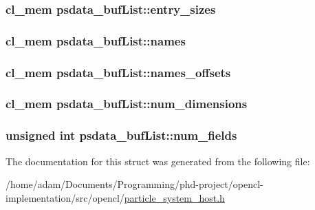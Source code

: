 \subsubsection[{entry\+\_\+sizes}]{\setlength{\rightskip}{0pt plus 5cm}cl\+\_\+mem psdata\+\_\+buf\+List\+::entry\+\_\+sizes}\label{structpsdata__bufList_a887652ee87b5f358abf6ad65f37b4800}
\hypertarget{structpsdata__bufList_a692e26c884416e7b932f2785eb0a9f97}{}
\subsubsection[{names}]{\setlength{\rightskip}{0pt plus 5cm}cl\+\_\+mem psdata\+\_\+buf\+List\+::names}\label{structpsdata__bufList_a692e26c884416e7b932f2785eb0a9f97}
\hypertarget{structpsdata__bufList_a959534753c9b5429408fdb1c99f4479c}{}
\subsubsection[{names\+\_\+offsets}]{\setlength{\rightskip}{0pt plus 5cm}cl\+\_\+mem psdata\+\_\+buf\+List\+::names\+\_\+offsets}\label{structpsdata__bufList_a959534753c9b5429408fdb1c99f4479c}
\hypertarget{structpsdata__bufList_ab88f6bd66f625383d9781707d266cd66}{}
\subsubsection[{num\+\_\+dimensions}]{\setlength{\rightskip}{0pt plus 5cm}cl\+\_\+mem psdata\+\_\+buf\+List\+::num\+\_\+dimensions}\label{structpsdata__bufList_ab88f6bd66f625383d9781707d266cd66}
\hypertarget{structpsdata__bufList_a8150194819034d266db259d3469e3093}{}
\subsubsection[{num\+\_\+fields}]{\setlength{\rightskip}{0pt plus 5cm}unsigned int psdata\+\_\+buf\+List\+::num\+\_\+fields}\label{structpsdata__bufList_a8150194819034d266db259d3469e3093}


The documentation for this struct was generated from the following file\+:\begin{DoxyCompactItemize}
\item 
/home/adam/\+Documents/\+Programming/phd-\/project/opencl-\/implementation/src/opencl/\hyperlink{particle__system__host_8h}{particle\+\_\+system\+\_\+host.\+h}\end{DoxyCompactItemize}
